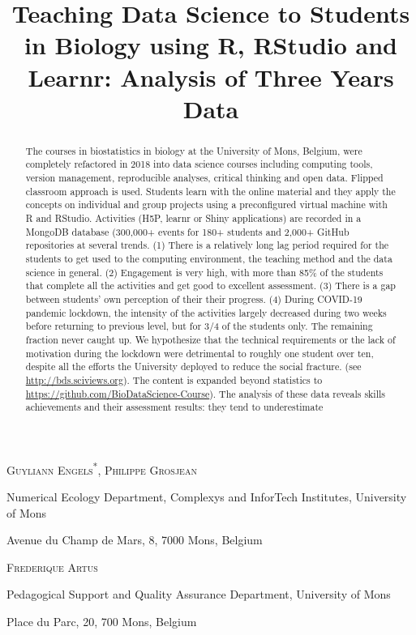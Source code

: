 \documentclass{aims}
\title[Teaching Data Science in
Biology] %
      {Teaching Data Science to Students in Biology using R, RStudio and
Learnr: Analysis of Three Years Data}
\author[Guyliann Engels, Philippe Grosjean and Frédérique Artus]{}
\theoremstyle{definition}
\begin{document}
\maketitle

\centerline{\scshape Guyliann Engels\textsuperscript{*}, Philippe Grosjean}
\medskip
{\footnotesize
 \centerline{Numerical Ecology Department, Complexys and InforTech Institutes, University of Mons}
   \centerline{Avenue du Champ de Mars, 8, 7000 Mons, Belgium}
} %

\medskip

\centerline{\scshape Frederique Artus}

\medskip
{\footnotesize
 \centerline{ Pedagogical Support and Quality Assurance Department, University of Mons}
   \centerline{Place du Parc, 20, 700 Mons, Belgium}
}

\bigskip



\begin{abstract}
  The courses in biostatistics in biology at the University of Mons,
  Belgium, were completely refactored in 2018 into data science courses
  including computing tools, version management, reproducible analyses,
  critical thinking and open data. Flipped classroom approach is used.
  Students learn with the online material and they apply the concepts on
  individual and group projects using a preconfigured virtual machine
  with R and RStudio. Activities (H5P, learnr or Shiny applications) are
  recorded in a MongoDB database (300,000+ events for 180+ students and
  2,000+ GitHub repositories at several trends. (1) There is a
  relatively long lag period required for the students to get used to
  the computing environment, the teaching method and the data science in
  general. (2) Engagement is very high, with more than 85\% of the
  students that complete all the activities and get good to excellent
  assessment. (3) There is a gap between students' own perception of
  their their progress. (4) During COVID-19 pandemic lockdown, the
  intensity of the activities largely decreased during two weeks before
  returning to previous level, but for 3/4 of the students only. The
  remaining fraction never caught up. We hypothesize that the technical
  requirements or the lack of motivation during the lockdown were
  detrimental to roughly one student over ten, despite all the efforts
  the University deployed to reduce the social fracture. (see
  \url{http://bds.sciviews.org}). The content is expanded beyond
  statistics to \url{https://github.com/BioDataScience-Course}). The
  analysis of these data reveals skills achievements and their
  assessment results: they tend to underestimate
\end{abstract}
\end{document}
